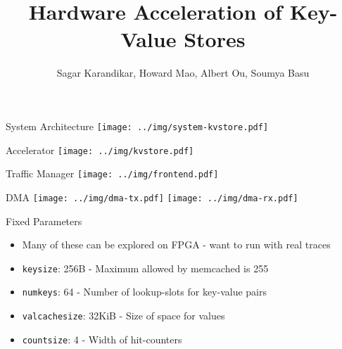 \documentclass{beamer}
\title{Hardware Acceleration of Key-Value Stores}
\author{Sagar Karandikar, Howard Mao, Albert Ou, Soumya Basu}
\institute[UC Berkeley]{\textsc{University of California, Berkeley}}
\begin{document}
\frame{\titlepage}

\begin{frame}
    
\end{frame}

\begin{frame}{System Architecture}
    \texttt{[image: ../img/system-kvstore.pdf]}
\end{frame}

\begin{frame}{Accelerator}
    \texttt{[image: ../img/kvstore.pdf]}
\end{frame}

\begin{frame}{Traffic Manager}
    \texttt{[image: ../img/frontend.pdf]}
\end{frame}

\begin{frame}{DMA}
    \texttt{[image: ../img/dma-tx.pdf]}
    \texttt{[image: ../img/dma-rx.pdf]}
\end{frame}

\begin{frame}
    
\end{frame}

\begin{frame}{Fixed Parameters}
    \begin{itemize}
        \item Many of these can be explored on FPGA - want to run with real traces
        \item \texttt{keysize}: 256B - Maximum allowed by memcached is 255
        \item \texttt{numkeys}: 64 - Number of lookup-slots for key-value pairs
        \item \texttt{valcachesize}: 32KiB - Size of space for values
        \item \texttt{countsize}: 4 - Width of hit-counters
    \end{itemize}
\end{frame}
\end{document}
